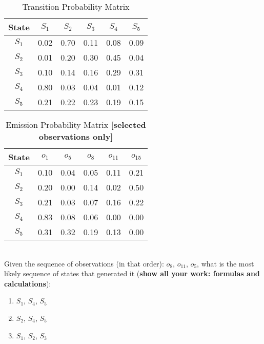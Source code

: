 \documentclass[assignment={3},
	duedate={Sunday, March 31, 2024, 11:59 PM CST},
	points={80},
	type={Written},
	template=true
]{cs581homework}
\begin{document}
\begin{minipage}[b]{0.45\textwidth}
	\begin{table}[H]
		\centering
		\caption{Transition Probability Matrix}
		\label{tab:transitions}
		\begin{tabular}{|*{6}{c|}}
			\hline
			\textbf{State} & $S_{1}$ & $S_{2}$ & $S_{3}$ & $S_{4}$ & $S_{5}$ \\
			\hline
			$S_{1}$ & 0.02 & 0.70 & 0.11 & 0.08 & 0.09 \\
			\hline
			$S_{2}$ & 0.01 & 0.20 & 0.30 & 0.45 & 0.04 \\
			\hline
			$S_{3}$ & 0.10 & 0.14 & 0.16 & 0.29 & 0.31 \\
			\hline
			$S_{4}$ & 0.80 & 0.03 & 0.04 & 0.01 & 0.12 \\
			\hline
			$S_{5}$ & 0.21 & 0.22 & 0.23 & 0.19 & 0.15 \\
			\hline
		\end{tabular}
	\end{table}
\end{minipage}
\begin{minipage}[b]{0.55\textwidth}
	\begin{table}[H]
		\centering
		\caption{Emission Probability Matrix \textbf{[selected observations only]}}
		\label{tab:emissions}
		\begin{tabular}{|*{6}{c|}}
			\hline
			\textbf{State} & $o_{1}$ & $o_{5}$ & $o_{8}$ & $o_{11}$ & $o_{15}$ \\
			\hline
			$S_{1}$ & 0.10 & 0.04 & 0.05 & 0.11 & 0.21 \\
			\hline
			$S_{2}$ & 0.20 & 0.00 & 0.14 & 0.02 & 0.50 \\
			\hline
			$S_{3}$ & 0.21 & 0.03 & 0.07 & 0.16 & 0.22 \\
			\hline
			$S_{4}$ & 0.83 & 0.08 & 0.06 & 0.00 & 0.00 \\
			\hline
			$S_{5}$ & 0.31 & 0.32 & 0.19 & 0.13 & 0.00 \\
			\hline
		\end{tabular}
	\end{table}
\end{minipage}\\

Given the sequence of observations (in that order): $o_{8}$, $o_{11}$, $o_{5}$, what is the most likely sequence of states that generated it (\textbf{show all your work: formulas and calculations}):

\begin{enumerate}[label=\alph*)]
	\item $S_{1}$, $S_{4}$, $S_{5}$
	\item $S_{2}$, $S_{4}$, $S_{5}$
	\item $S_{1}$, $S_{2}$, $S_{3}$
\end{enumerate}
\end{document}
